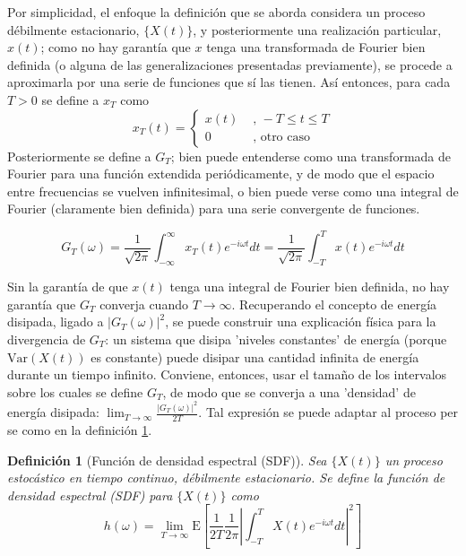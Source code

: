 \documentclass[12pt,a4paper]{mitthesis}
\newtheorem{defn}{Definici\'on}
\newcommand{\intR}{\int_{-\infty}^{\infty}}
\newcommand{\E}[1]{\mathrm{E}\left[ #1 \right]}
\newcommand{\Var}[1]{\mathrm{Var}\left( #1 \right)}
\newcommand{\abso}[1]{\left| #1 \right|}
\begin{document}
Por simplicidad, el enfoque la definici\'on que se aborda considera un proceso d\'ebilmente 
estacionario, $\{X(t)\}$, y posteriormente una realizaci\'on particular, $x(t)$; como no hay 
garant\'ia que $x$ tenga una transformada de Fourier bien definida (o alguna de las 
generalizaciones presentadas previamente), se procede a aproximarla por una serie de funciones que 
s\'i las tienen.
As\'i entonces, para cada $T>0$ se define a $x_T$ como
\begin{equation*}
x_T(t) = 
\begin{cases}
x(t) & \text{ , } -T\leq t \leq T \\
0 & \text{ , otro caso}
\end{cases}
\end{equation*}
Posteriormente se define a $G_T$; bien puede entenderse como una transformada de Fourier para una 
funci\'on extendida peri\'odicamente, y de modo que el espacio entre frecuencias se vuelven 
infinitesimal, o bien puede verse como una integral de Fourier (claramente bien definida) para una 
serie convergente de funciones.

\begin{equation*}
G_T (\omega) = \frac{1}{\sqrt{2 \pi}} \intR x_T(t) e^{-i \omega t} dt
= \frac{1}{\sqrt{2 \pi}} \int_{-T}^{T} x(t) e^{-i \omega t} dt
\end{equation*}

Sin la garant\'ia de que $x(t)$ tenga una integral de Fourier bien definida, no hay garant\'ia que 
$G_T$ converja cuando $T\rightarrow \infty$. Recuperando el concepto de energ\'ia disipada, ligado 
a $\left| G_T(\omega) \right|^{2}$, se puede construir una explicaci\'on f\'isica para la 
divergencia de $G_T$: un sistema que disipa 'niveles constantes' de energ\'ia (porque $\Var{X(t)}$ 
es constante) puede disipar una cantidad infinita de energ\'ia durante un tiempo infinito. 
Conviene, entonces, usar el tama\~no de los intervalos sobre los cuales se define $G_T$, de modo 
que se converja a una 'densidad' de energ\'ia disipada:
$\lim_{T\rightarrow{\infty}} \frac{ \left| G_T(\omega) \right|^{2}}{2 T}$.
Tal expresi\'on se puede adaptar al proceso per se como en la definici\'on \ref{SDF}.

\begin{defn}[Funci\'on de densidad espectral (SDF)]
Sea $\{X(t)\}$ un proceso estoc\'astico en tiempo continuo, d\'ebilmente estacionario. Se define la 
funci\'on de densidad espectral (SDF) para $\{X(t)\}$ como
\begin{equation*}
h(\omega) = \lim_{T\rightarrow \infty} \E{ \frac{1}{2T} \frac{1}{2 \pi}
\abso{ \int_{-T}^{T} X(t) e^{-i \omega t} dt}^{2} }
\end{equation*}
\label{SDF}
\end{defn}
\end{document}
